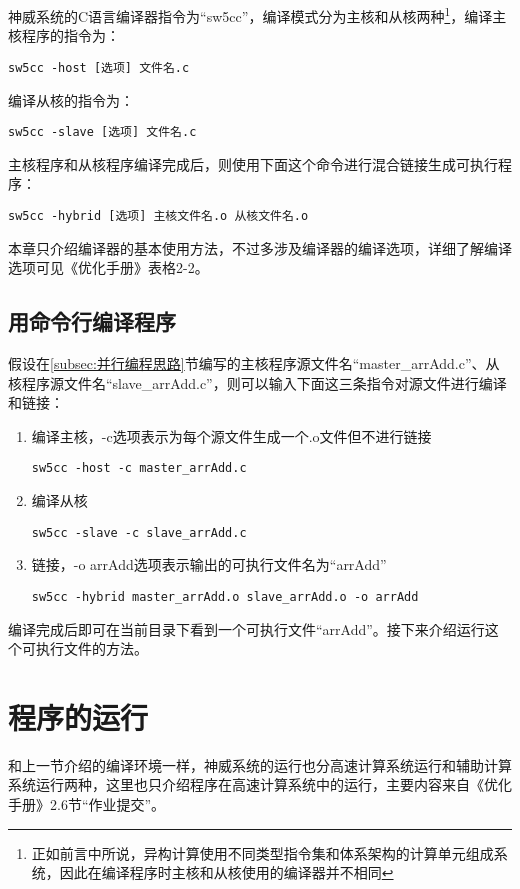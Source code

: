 神威系统的C语言编译器指令为“sw5cc”，编译模式分为主核和从核两种\footnote{正如前言中所说，异构计算使用不同类型指令集和体系架构的计算单元组成系统，因此在编译程序时主核和从核使用的编译器并不相同}，编译主核程序的指令为：
\begin{lstlisting}
sw5cc -host [选项] 文件名.c
\end{lstlisting}
编译从核的指令为：
\begin{lstlisting}
sw5cc -slave [选项] 文件名.c
\end{lstlisting}
主核程序和从核程序编译完成后，则使用下面这个命令进行混合链接生成可执行程序：
\begin{lstlisting}
sw5cc -hybrid [选项] 主核文件名.o 从核文件名.o
\end{lstlisting}

本章只介绍编译器的基本使用方法，不过多涉及编译器的编译选项，详细了解编译选项可见《优化手册》表格2-2。

\subsection{用命令行编译程序}\label{subsec:用命令行编译程序}
假设在\ref{subsec:并行编程思路}节编写的主核程序源文件名“master\_arrAdd.c”、从核程序源文件名“slave\_arrAdd.c”，则可以输入下面这三条指令对源文件进行编译和链接：
\begin{enumerate}
	\item 编译主核，-c选项表示为每个源文件生成一个.o文件但不进行链接
	      \begin{lstlisting}
sw5cc -host -c master_arrAdd.c
\end{lstlisting}
	\item 编译从核
	      \begin{lstlisting}
sw5cc -slave -c slave_arrAdd.c
\end{lstlisting}
	\item 链接，-o arrAdd选项表示输出的可执行文件名为“arrAdd”
	      \begin{lstlisting}
sw5cc -hybrid master_arrAdd.o slave_arrAdd.o -o arrAdd
\end{lstlisting}
\end{enumerate}

编译完成后即可在当前目录下看到一个可执行文件“arrAdd”。接下来介绍运行这个可执行文件的方法。

\section{程序的运行}\label{sec:程序的运行}
和上一节介绍的编译环境一样，神威系统的运行也分高速计算系统运行和辅助计算系统运行两种，这里也只介绍程序在高速计算系统中的运行，主要内容来自《优化手册》2.6节“作业提交”。

